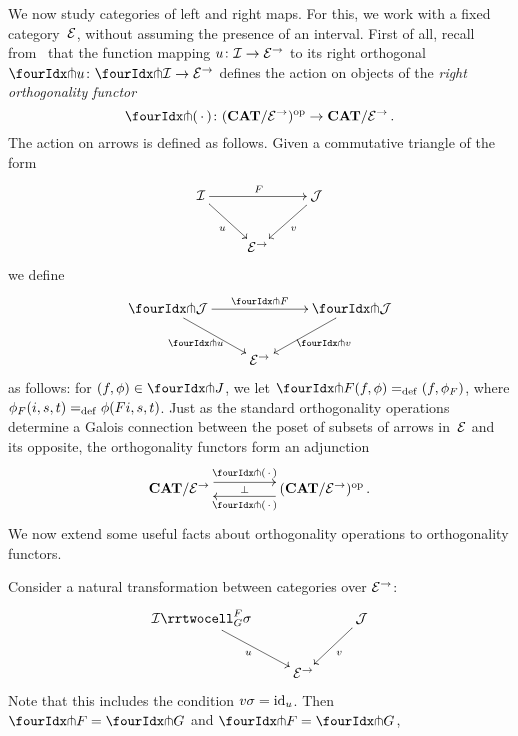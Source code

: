 \documentclass[reqno,10pt,a4paper,oneside]{amsart}
\begin{document}
We now study categories of left and right maps. For this, we work with a fixed category~$\mathcal{E}$, without assuming the presence of an interval. First of all, recall from~\cite{garner:small-object-argument} that the function mapping $u \colon \mathcal{I} \to \mathcal{E}^\to$ to its right orthogonal $\liftr{u} \co \liftr{\cal{I}} \to \cal{E}^\to$ defines the action on objects of the \emph{right orthogonality functor}
\[
\liftr{\brarghole} \co  (\CAT/\catE^{\to})^{\op} \to \CAT/\catE^{\to} \, .
\]
The action  on arrows is defined as follows. Given a commutative triangle of the form
\[
\xymatrix{
\cal{I} \ar[dr]_u \ar[rr]^F & & \cal{J} \ar[dl]^{v} \\
 & \catE^\to }
 \]
we define 
\[
\xymatrix{
\liftr{\cal{J}} \ar[dr]_{\liftr{u}} \ar[rr]^{\liftr{F}} & & \liftr{\cal{J}} \ar[dl]^{\liftr{v}} \\
 & \catE^\to }
\]
as follows: for $(f, \phi) \in \liftr{J}$, we let $\liftr{F}(f,\phi) \defeq (f, \phi_F)$, where $\phi_F(i, s, t) =_{\operatorname{def}} \phi(Fi, s, t)$. 
Just as the standard orthogonality operations determine a Galois connection between the poset of subsets of arrows in~$\mathcal{E}$ and its opposite, the orthogonality functors form an adjunction 
\begin{equation}
\label{garner-adjunction}
\begin{gathered}
\xymatrix@C+2em{
  \CAT/\catE^{\to}
  \ar@<5pt>[r]^-{\liftl{\brarghole}}
  \ar@{}[r]|-{\bot}
&
  (\CAT/\catE^{\to})^{\op} \, .
  \ar@<5pt>[l]^-{\liftr{\brarghole}}
}
\end{gathered}
\end{equation}
We now extend some useful facts about orthogonality operations to orthogonality functors.






\begin{proposition}
Consider a natural transformation between categories over $\mathcal{E}^{\to}$:
\[
\xymatrix{
  \cal{I}
  \rrtwocell_G^F{\sigma}
 \ar[dr]_{u}
&&
  \cal{J}
  \ar[dl]^{v}
\\&
  \catE^{\to}
}
\]
Note that this includes the condition $v \sigma = \operatorname{id}_u$.
Then $\liftr{F} = \liftr{G}$ and $\liftl{F} = \liftl{G}$, 
\end{proposition}
\end{document}
